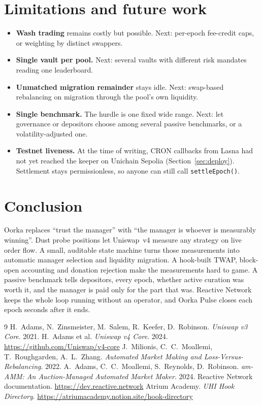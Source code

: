 \documentclass[11pt,a4paper]{article}
\newcommand{\code}[1]{\texttt{\small #1}}
\begin{document}
\section{Limitations and future work}
\begin{itemize}
  \item \textbf{Wash trading} remains costly but possible. Next: per-epoch fee-credit caps, or weighting by distinct swappers.
  \item \textbf{Single vault per pool.} Next: several vaults with different risk mandates reading one leaderboard.
  \item \textbf{Unmatched migration remainder} stays idle. Next: swap-based rebalancing on migration through the pool's own liquidity.
  \item \textbf{Single benchmark.} The hurdle is one fixed wide range. Next: let governance or depositors choose among several passive benchmarks, or a volatility-adjusted one.
  \item \textbf{Testnet liveness.} At the time of writing, CRON callbacks from Lasna had not yet reached the keeper on Unichain Sepolia (Section~\ref{sec:deploy}). Settlement stays permissionless, so anyone can still call \code{settleEpoch()}.
\end{itemize}

\section{Conclusion}
Oorka replaces ``trust the manager'' with ``the manager is whoever is measurably winning''. Dust probe positions let Uniswap~v4 measure any strategy on live order flow. A small, auditable state machine turns those measurements into automatic manager selection and liquidity migration. A hook-built TWAP, block-open accounting and donation rejection make the measurements hard to game. A passive benchmark tells depositors, every epoch, whether active curation was worth it, and the manager is paid only for the part that was. Reactive Network keeps the whole loop running without an operator, and Oorka Pulse closes each epoch seconds after it ends.

\begin{thebibliography}{9}\small
{} H.~Adams, N.~Zinsmeister, M.~Salem, R.~Keefer, D.~Robinson. \emph{Uniswap v3 Core}. 2021.
 H.~Adams et al. \emph{Uniswap v4 Core}. 2024. \url{https://github.com/Uniswap/v4-core}
 J.~Milionis, C.~C.~Moallemi, T.~Roughgarden, A.~L.~Zhang. \emph{Automated Market Making and Loss-Versus-Rebalancing}. 2022.
 A.~Adams, C.~C.~Moallemi, S.~Reynolds, D.~Robinson. \emph{am-AMM: An Auction-Managed Automated Market Maker}. 2024.
 Reactive Network documentation. \url{https://dev.reactive.network}
 Atrium Academy. \emph{UHI Hook Directory}. \url{https://atriumacademy.notion.site/hook-directory}
\end{thebibliography}
\end{document}
